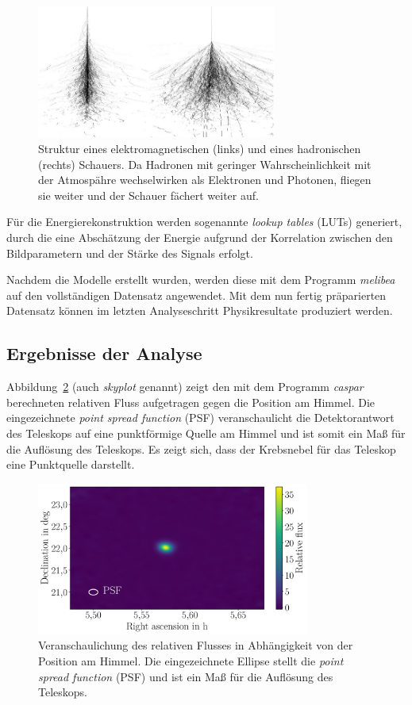 \begin{figure}
  \centering
  \includegraphics[width=0.7\textwidth]{figures/gamma_hadron.png}
  \caption{Struktur eines elektromagnetischen (links) und eines hadronischen
  (rechts) Schauers. Da Hadronen mit geringer Wahrscheinlichkeit mit der
  Atmospähre wechselwirken als Elektronen und Photonen, fliegen sie weiter und
  der Schauer fächert weiter auf.}
  \label{fig:gamma_hadron}
\end{figure}

Für die Energierekonstruktion werden sogenannte \textit{lookup tables} (LUTs)
generiert, durch die eine Abschätzung der Energie aufgrund der Korrelation
zwischen den Bildparametern und der Stärke des Signals erfolgt.

Nachdem die Modelle erstellt wurden, werden diese mit dem Programm
\textit{melibea} auf den vollständigen Datensatz angewendet. Mit dem nun fertig
präparierten Datensatz können im letzten Analyseschritt Physikresultate
produziert werden.

\subsection{Ergebnisse der Analyse}

Abbildung~\ref{fig:skyplot} (auch \textit{skyplot} genannt) zeigt den mit dem
Programm \textit{caspar} berechneten relativen Fluss aufgetragen gegen die
Position am Himmel. Die eingezeichnete \textit{point spread function} (PSF)
veranschaulicht die Detektorantwort des Teleskops auf eine punktförmige Quelle
am Himmel und ist somit ein Maß für die Auflösung des Teleskops. Es zeigt sich,
dass der Krebsnebel für das Teleskop eine Punktquelle darstellt.

\begin{figure}
  \centering
  \includegraphics[width=0.8\textwidth]{figures/caspar_flux_skymap.pdf}
  \caption{Veranschaulichung des relativen Flusses in Abhängigkeit von der
  Position am Himmel. Die eingezeichnete Ellipse stellt die
  \textit{point spread function} (PSF) und ist ein Maß für die Auflösung des
  Teleskops.}
  \label{fig:skyplot}
\end{figure}

